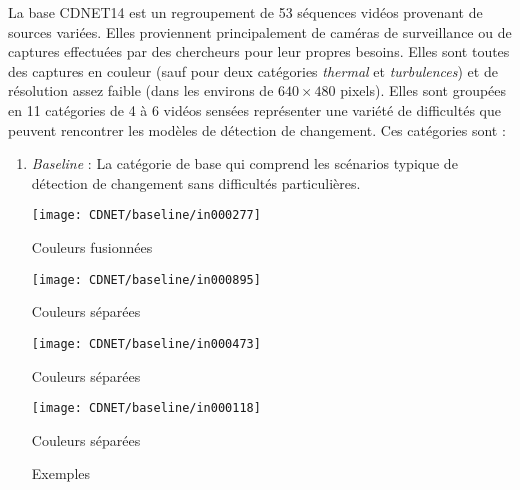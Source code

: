 	La base CDNET14 est un regroupement de 53 séquences vidéos provenant de sources variées. Elles proviennent principalement de caméras de surveillance ou de captures effectuées par des chercheurs pour leur propres besoins. Elles sont toutes des captures en couleur (sauf pour deux catégories \textit{thermal} et \textit{turbulences}) et de résolution assez faible (dans les environs de $640 \times 480$ pixels). Elles sont groupées en 11 catégories de 4 à 6 vidéos sensées représenter une variété de difficultés que peuvent rencontrer les modèles de détection de changement. Ces catégories sont :
	\begin{enumerate}
		\item \textit{Baseline} : La catégorie de base qui comprend les scénarios typique de détection de changement sans difficultés particulières.
		
		\begin{figureth}
			\begin{subfigureth}{0.24\textwidth}
				\texttt{[image: CDNET/baseline/in000277]}\caption{Couleurs fusionnées}	
			\end{subfigureth}
			\begin{subfigureth}{0.24\textwidth}
				\texttt{[image: CDNET/baseline/in000895]}\caption{Couleurs séparées}	
			\end{subfigureth}
			\begin{subfigureth}{0.24\textwidth}
				\texttt{[image: CDNET/baseline/in000473]}\caption{Couleurs séparées}	
			\end{subfigureth}
			\begin{subfigureth}{0.24\textwidth}
				\texttt{[image: CDNET/baseline/in000118]}\caption{Couleurs séparées}	
			\end{subfigureth}
			\caption[Baseline category]{Exemples }\label{fig:cdnet:baseline}
		\end{figureth}


\end{enumerate}
